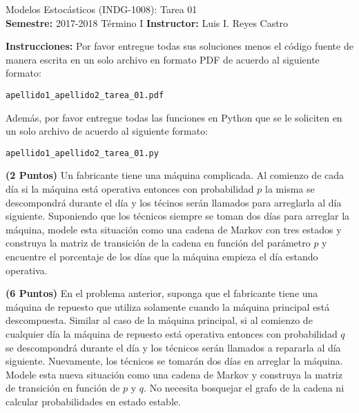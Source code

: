 \documentclass[ a4paper, twoside, 11pt]{article}
\newcommand{\numero}{01}
\begin{document}
\allowdisplaybreaks



\begin{center}
\Large Modelos Estoc\'asticos (INDG-1008): Tarea \numero \\[1ex]
\small \textbf{Semestre:} 2017-2018 T\'ermino I \qquad
\textbf{Instructor:} Luis I. Reyes Castro
\end{center}
\fullskip

%

\textbf{Instrucciones:} Por favor entregue todas sus soluciones menos el c\'odigo fuente de manera escrita en un solo archivo en formato PDF de acuerdo al siguiente formato: 
\halfcut
\begin{center}
{\tt apellido1\_apellido2\_tarea\_01.pdf }
\end{center}
Adem\'as, por favor entregue todas las funciones en Python que se le soliciten en un solo archivo de acuerdo al siguiente formato: 
\halfcut
\begin{center}
{\tt apellido1\_apellido2\_tarea\_01.py }
\end{center}
\fullskip
\halfskip

\begin{problem}
\textbf{(2 Puntos)} Un fabricante tiene una m\'aquina complicada. Al comienzo de cada d\'ia si la m\'aquina est\'a operativa entonces con probabilidad $p$ la misma se descompondr\'a durante el d\'ia y los t\'ecinos ser\'an llamados para arreglarla al d\'ia siguiente. Suponiendo que los t\'ecnicos siempre se toman dos d\'ias para arreglar la m\'aquina, modele esta situaci\'on como una cadena de Markov con tres estados y construya la matriz de transici\'on de la cadena en funci\'on del par\'ametro $p$ y encuentre el porcentaje de los d\'ias que la m\'aquina empieza el d\'ia estando operativa. 

\end{problem}
\vspace{\baselineskip}

\begin{problem}
\textbf{(6 Puntos)} En el problema anterior, suponga que el fabricante tiene una m\'aquina de repuesto que utiliza solamente cuando la m\'aquina principal est\'a descompuesta. Similar al caso de la m\'aquina principal, si al comienzo de cualquier d\'ia la m\'aquina de repuesto est\'a operativa entonces con probabilidad $q$ se descompondr\'a durante el d\'ia y los t\'ecnicos ser\'an llamados a repararla al d\'ia siguiente. Nuevamente, los t\'ecnicos se tomar\'an dos d\'ias en arreglar la m\'aquina. Modele esta nueva situaci\'on como una cadena de Markov y construya la matriz de transici\'on en funci\'on de $p$ y $q$. No necesita bosquejar el grafo de la cadena ni calcular probabilidades en estado estable. 

\end{problem}
\vspace{\baselineskip}
\end{document}

